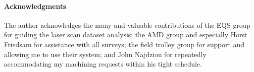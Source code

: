 \paragraph{Acknowledgments}

The author acknowledges the many and valuable contributions of the EQS group for guiding the laser scan dataset analysis; the AMD group and especially Horst Friedsam for assistance with all surveys; the field trolley group for support and allowing me to use their system; and John Najdzion for repeatedly accommodating my machining requests within his tight schedule. 

